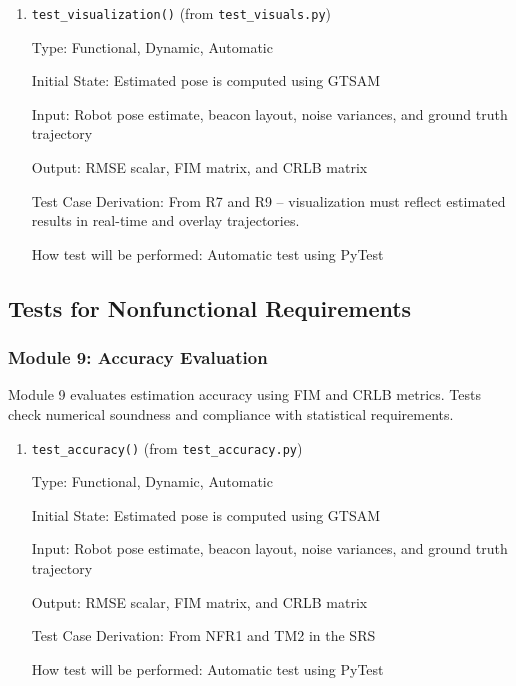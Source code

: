 \documentclass[12pt, titlepage]{article}
\begin{document}
\begin{enumerate}
  \item {\texttt{test\_visualization()} (from \texttt{test\_visuals.py})}
  
  Type: Functional, Dynamic, Automatic
            
  Initial State: Estimated pose is computed using GTSAM
            
  Input: Robot pose estimate, beacon layout, noise variances, and ground truth trajectory
            
  Output: RMSE scalar, FIM matrix, and CRLB matrix
  
  Test Case Derivation: From R7 and R9 – visualization must reflect estimated results in real-time and overlay trajectories.
  
  How test will be performed: Automatic test using PyTest
\end{enumerate}



\subsection{Tests for Nonfunctional Requirements}



\subsubsection{Module 9: Accuracy Evaluation}
Module 9 evaluates estimation accuracy using FIM and CRLB metrics. Tests check numerical soundness and compliance with statistical requirements.

\begin{enumerate}
  \item {\texttt{test\_accuracy()} (from \texttt{test\_accuracy.py})}
  
  Type: Functional, Dynamic, Automatic
            
  Initial State: Estimated pose is computed using GTSAM
            
  Input: Robot pose estimate, beacon layout, noise variances, and ground truth trajectory
            
  Output: RMSE scalar, FIM matrix, and CRLB matrix
  
  Test Case Derivation: From NFR1 and TM2 in the SRS
  
  How test will be performed: Automatic test using PyTest
\end{enumerate}
\end{document}
